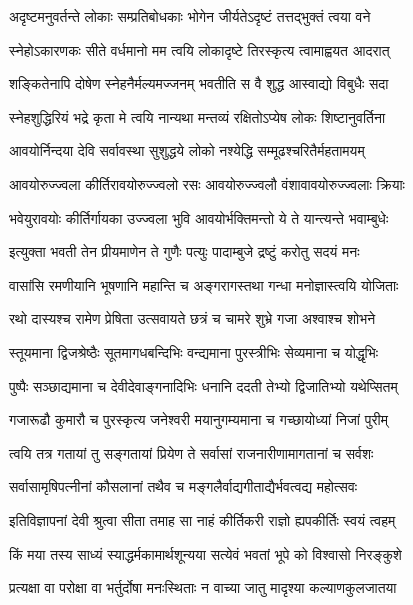 \twolineshloka
{अदृष्टमनुवर्तन्ते लोकाः सम्प्रतिबोधकाः}
{भोगेन जीर्यतेऽदृष्टं तत्तद्भुक्तं त्वया वने}%

\twolineshloka
{स्नेहोऽकारणकः सीते वर्धमानो मम त्वयि}
{लोकादृष्टे तिरस्कृत्य त्वामाह्वयत आदरात्}%

\twolineshloka
{शङ्कितेनापि दोषेण स्नेहनैर्मल्यमज्जनम्}
{भवतीति स वै शुद्ध आस्वाद्यो विबुधैः सदा}%

\twolineshloka
{स्नेहशुद्धिरियं भद्रे कृता मे त्वयि नान्यथा}
{मन्तव्यं रक्षितोऽप्येष लोकः शिष्टानुवर्तिना}%

\twolineshloka
{आवयोर्निन्दया देवि सर्वावस्था सुशुद्धये}
{लोको नश्येद्धि सम्मूढश्चरितैर्महतामयम्}%

\twolineshloka
{आवयोरुज्ज्वला कीर्तिरावयोरुज्ज्वलो रसः}
{आवयोरुज्ज्वलौ वंशावावयोरुज्ज्वलाः क्रियाः}%

\twolineshloka
{भवेयुरावयोः कीर्तिर्गायका उज्ज्वला भुवि}
{आवयोर्भक्तिमन्तो ये ते यान्त्यन्ते भवाम्बुधेः}%

\twolineshloka
{इत्युक्ता भवती तेन प्रीयमाणेन ते गुणैः}
{पत्युः पादाम्बुजे द्रष्टुं करोतु सदयं मनः}%

\twolineshloka
{वासांसि रमणीयानि भूषणानि महान्ति च}
{अङ्गरागस्तथा गन्धा मनोज्ञास्त्वयि योजिताः}%

\twolineshloka
{रथो दास्यश्च रामेण प्रेषिता उत्सवायते}
{छत्रं च चामरे शुभ्रे गजा अश्वाश्च शोभने}%

\twolineshloka
{स्तूयमाना द्विजश्रेष्ठैः सूतमागधबन्दिभिः}
{वन्द्यमाना पुरस्त्रीभिः सेव्यमाना च योद्धृभिः}%

\twolineshloka
{पुष्पैः सञ्छाद्यमाना च देवीदेवाङ्गनादिभिः}
{धनानि ददती तेभ्यो द्विजातिभ्यो यथेप्सितम्}%

\twolineshloka
{गजारूढौ कुमारौ च पुरस्कृत्य जनेश्वरी}
{मयानुगम्यमाना च गच्छायोध्यां निजां पुरीम्}%

\twolineshloka
{त्वयि तत्र गतायां तु सङ्गतायां प्रियेण ते}
{सर्वासां राजनारीणामागतानां च सर्वशः}%

\twolineshloka
{सर्वासामृषिपत्नीनां कौसलानां तथैव च}
{मङ्गलैर्वाद्यगीताद्यैर्भवत्वद्य महोत्सवः}%


\twolineshloka
{इतिविज्ञापनां देवी श्रुत्वा सीता तमाह सा}
{नाहं कीर्तिकरी राज्ञो ह्यपकीर्तिः स्वयं त्वहम्}%

\twolineshloka
{किं मया तस्य साध्यं स्याद्धर्मकामार्थशून्यया}
{सत्येवं भवतां भूपे को विश्वासो निरङ्कुशे}%

\twolineshloka
{प्रत्यक्षा वा परोक्षा वा भर्तुर्दोषा मनःस्थिताः}
{न वाच्या जातु मादृश्या कल्याणकुलजातया}%

